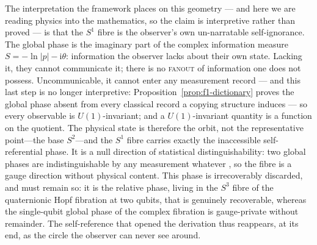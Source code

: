 The interpretation the framework places on this geometry --- and here we are
reading physics into the mathematics, so the claim is interpretive rather than
proved --- is that the $S^{1}$ fibre is the observer's own un-narratable
self-ignorance. The global phase is the imaginary part of the complex information
measure $S=-\ln\lvert p\rvert-\mathrm{i}\theta$: information the observer lacks
about their own state. Lacking it, they cannot communicate it; there is no
\textsc{fanout} of information one does not possess. Uncommunicable, it cannot enter any
measurement record --- and this last step is no longer interpretive: Proposition~\ref{prop:f1-dictionary}
proves the global phase absent from every classical record a copying structure induces --- so every
observable is $U(1)$-invariant; and a
$U(1)$-invariant quantity is a function on the quotient. The physical state is
therefore the orbit, not the representative point---the base $S^{2}$---and the
$S^{1}$ fibre carries exactly the inaccessible self-referential phase. It is a
null direction of statistical distinguishability: two global phases are
indistinguishable by any measurement whatever \autocite{wooters_1981}, so the fibre is a gauge direction without physical content. This phase is irrecoverably
discarded, and must remain so: it is the relative phase, living in the $S^{3}$
fibre of the quaternionic Hopf fibration at two qubits, that is genuinely
recoverable, whereas the single-qubit global phase of the complex fibration is
gauge-private without remainder. The self-reference that opened the derivation
thus reappears, at its end, as the circle the observer can never see around.